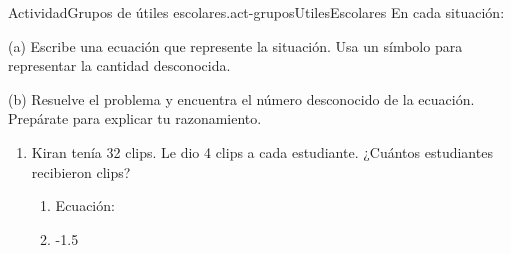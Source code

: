 \documentclass[14pt]{extarticle}
\begin{document}
\begin{activity}{Actividad}{Grupos de útiles escolares.}{act-gruposUtilesEscolares}%
En cada situación:%
\par
(a) Escribe una ecuación que represente la situación. Usa un símbolo para representar la cantidad desconocida.%
\par
(b) Resuelve el problema y encuentra el número desconocido de la ecuación. Prepárate para explicar tu razonamiento.%
%
\begin{enumerate}
\item{}Kiran tenía 32 clips. Le dio 4 clips a cada estudiante. ¿Cuántos estudiantes recibieron clips?%
%
\begin{enumerate}
\item{}Ecuación:%
\item{}\begin{image}{0}{1}{0}{-1.5\baselineskip}%

\end{image}
\end{enumerate}
\end{enumerate}
\end{activity}
\end{document}
